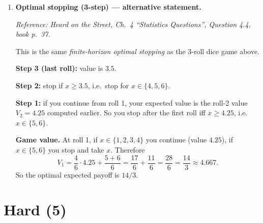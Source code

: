 \documentclass[11pt]{article}
\begin{document}
\begin{enumerate}[leftmargin=*, itemsep=1.0em]
\item \textbf{Optimal stopping (3-step) --- alternative statement.}

\textit{Reference: Heard on the Street, Ch.\ 4 ``Statistics Questions'', Question 4.4, book p.\ 37.}

\medskip
This is the same \emph{finite-horizon optimal stopping} as the 3-roll dice game above.

\textbf{Step 3 (last roll):} value is $3.5$.

\textbf{Step 2:} stop if $x\ge 3.5$, i.e.\ stop for $x\in\{4,5,6\}$.

\textbf{Step 1:} if you continue from roll 1, your expected value is the roll-2 value $V_2=4.25$ computed earlier.
So you stop after the first roll iff $x\ge 4.25$, i.e.\ $x\in\{5,6\}$.

\medskip
\textbf{Game value.}
At roll 1, if $x\in\{1,2,3,4\}$ you continue (value $4.25$), if $x\in\{5,6\}$ you stop and take $x$.
Therefore
\[
V_1=\frac{4}{6}\cdot 4.25 + \frac{5+6}{6}
=\frac{17}{6}+\frac{11}{6}
=\frac{28}{6}=\frac{14}{3}\approx 4.667.
\]
So the optimal expected payoff is $\boxed{14/3}$.

\end{enumerate}

\section*{Hard (5)}
\end{document}
